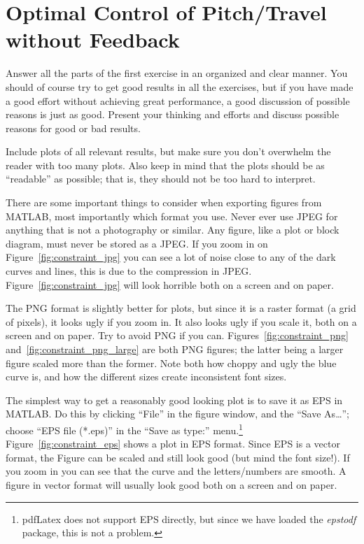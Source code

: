 \section{Optimal Control of Pitch/Travel without Feedback}\label{sec:prob2}
Answer all the parts of the first exercise in an organized and clear manner. You should of course try to get good results in all the exercises, but if you have made a good effort without achieving great performance, a good discussion of possible reasons is just as good. Present your thinking and efforts and discuss possible reasons for good or bad results.

Include plots of all relevant results, but make sure you don't overwhelm the reader with too many plots. Also keep in mind that the plots should be as ``readable'' as possible; that is, they should not be too hard to interpret.

There are some important things to consider when exporting figures from MATLAB, most importantly which format you use. Never ever use JPEG for anything that is not a photography or similar. Any figure, like a plot or block diagram, must never be stored as a JPEG. If you zoom in on Figure~\ref{fig:constraint_jpg} you can see a lot of noise close to any of the dark curves and lines, this is due to the compression in JPEG. Figure~\ref{fig:constraint_jpg} will look horrible both on a screen and on paper.

The PNG format is slightly better for plots, but since it is a raster format (a grid of pixels), it looks ugly if you zoom in. It also looks ugly if you scale it, both on a screen and on paper. Try to avoid PNG if you can. Figures~\ref{fig:constraint_png} and~\ref{fig:constraint_png_large} are both PNG figures; the latter being a larger figure scaled more than the former. Note both how choppy and ugly the blue curve is, and how the different sizes create inconsistent font sizes.

The simplest way to get a reasonably good looking plot is to save it as EPS in MATLAB. Do this by clicking ``File'' in the figure window, and the ``Save As\ldots''; choose ``EPS file (*.eps)'' in the ``Save as type:'' menu.\footnote{pdfLatex does not support EPS directly, but since we have loaded the \emph{epstodf} package, this is not a problem.} Figure~\ref{fig:constraint_eps} shows a plot in EPS format. Since EPS is a vector format, the Figure can be scaled and still look good (but mind the font size!). If you zoom in you can see that the curve and the letters/numbers are smooth. A figure in vector format will usually look good both on a screen and on paper.


